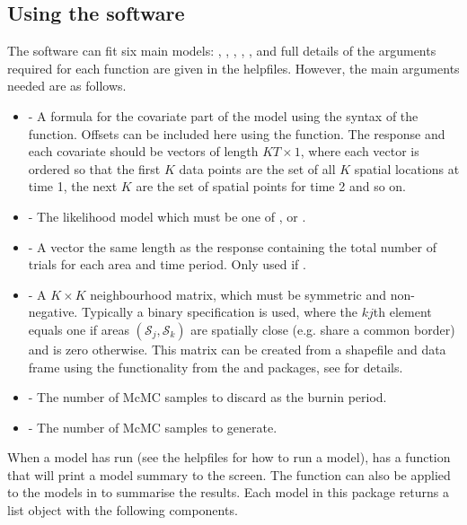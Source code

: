 \documentclass[article,shortnames,nojss]{jss}
\begin{document}
\subsection{Using the software}
The software can fit  six main models: , , ,  ,  , and full details of the arguments required for each function are given in the helpfiles. However, the main arguments needed are as follows.

\begin{itemize}
\item {} - A formula for the covariate part of the model using the syntax of the  function. Offsets can be included here using the  function. The response and each covariate should be vectors of length $KT\times 1$, where each vector is ordered so that the first $K$ data points are the set of all $K$ spatial locations at time 1, the next $K$ are the set of spatial points for time 2 and so on.

\item {} - The likelihood model which must  be one of ,  or .

\item {} - A vector the same length as the response containing the total number of trials  for each area and time period. Only used if . 

\item {} - A $K \times K$ neighbourhood matrix, which must be symmetric and non-negative. Typically a binary specification is used, where the $kj$th element equals one if areas $(\mathcal{S}_j, \mathcal{S}_k)$ are spatially close (e.g. share a common border) and is zero otherwise. This matrix can be created from a shapefile and data frame using the functionality from the  and  packages, see \cite{lee2013} for details.

\item {} - The number of McMC samples to discard as the burnin period.
    
\item {} - The number of McMC samples to generate.
\end{itemize}

When a model has run (see the helpfiles for how to run a model),  has a  function that will print a model summary to the screen. The  function  can also be applied to the models in  to summarise the results. Each model in this package returns a list object with the following components. 
\end{document}

